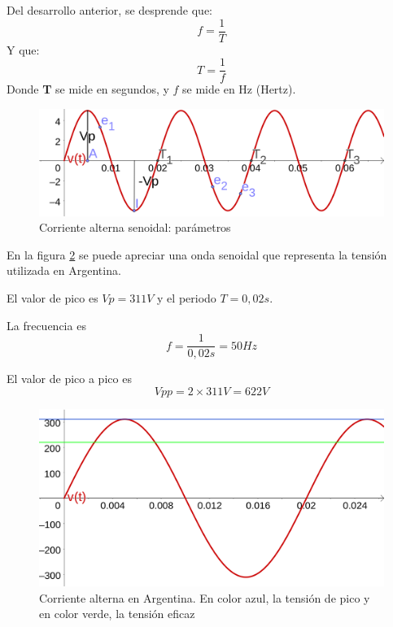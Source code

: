 Del desarrollo anterior, se desprende que:
\begin{equation}
	\label{eq:frec_ciclos}
	f=\frac{1}{T}
\end{equation}
Y que:
\begin{equation}
	\label{eq:ciclos_frec}
	T=\frac{1}{f}
\end{equation}
Donde \textbf{T} se mide en segundos, y \textbf{$f$} se mide en Hz (Hertz).
\begin{figure}[htbp]
  \includegraphics[scale=0.14]{images/ac}
  \caption{Corriente alterna senoidal: parámetros}
  \label{fig:ac}
\end{figure}
\begin{ejemplo}
	\label{ej:ac_argentina}
	En la figura \ref{fig:ac_argentina} se puede apreciar una onda senoidal que representa la tensión utilizada en Argentina.
	
	El valor de pico es $Vp = 311 V$ y el periodo $T = 0,02 s$.
	
	La frecuencia es $$f=\frac{1}{0,02 s}=50 Hz$$
	
	El valor de pico a pico es $$ Vpp = 2 \times 311 V = 622 V $$
\end{ejemplo}
\begin{figure}[htbp]
  \includegraphics[scale=0.1]{images/ac_argentina}
  \caption{Corriente alterna en Argentina. En color azul, la tensión de pico y en color verde, la tensión eficaz}
  \label{fig:ac_argentina}
\end{figure}

